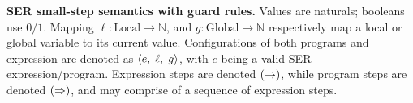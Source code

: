 \noindent\textbf{SER small-step semantics with guard rules.}
%
%
Values are naturals; booleans use $0/1$. Mapping $\ell:\mathrm{Local}\to\mathbb{N}$, and $g:\mathrm{Global}\to\mathbb{N}$ respectively map a local or global variable to its current value.
%
Configurations of both programs and expression are denoted as $\langle e,\; \ell,\; g\rangle$, with \(e\) being a valid SER expression/program. 
%
Expression steps are denoted $(\mathrel{\rightarrow})$, while program steps are denoted $(\mathrel{\Rightarrow})$, and may comprise of a sequence of expression steps.
%
%

